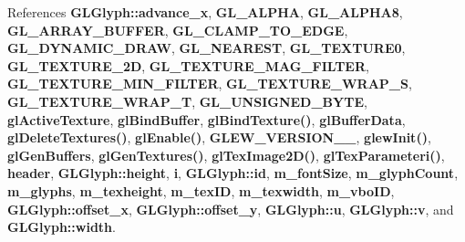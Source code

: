 References {\bf G\+L\+Glyph\+::advance\+\_\+x}, {\bf G\+L\+\_\+\+A\+L\+P\+HA}, {\bf G\+L\+\_\+\+A\+L\+P\+H\+A8}, {\bf G\+L\+\_\+\+A\+R\+R\+A\+Y\+\_\+\+B\+U\+F\+F\+ER}, {\bf G\+L\+\_\+\+C\+L\+A\+M\+P\+\_\+\+T\+O\+\_\+\+E\+D\+GE}, {\bf G\+L\+\_\+\+D\+Y\+N\+A\+M\+I\+C\+\_\+\+D\+R\+AW}, {\bf G\+L\+\_\+\+N\+E\+A\+R\+E\+ST}, {\bf G\+L\+\_\+\+T\+E\+X\+T\+U\+R\+E0}, {\bf G\+L\+\_\+\+T\+E\+X\+T\+U\+R\+E\+\_\+2D}, {\bf G\+L\+\_\+\+T\+E\+X\+T\+U\+R\+E\+\_\+\+M\+A\+G\+\_\+\+F\+I\+L\+T\+ER}, {\bf G\+L\+\_\+\+T\+E\+X\+T\+U\+R\+E\+\_\+\+M\+I\+N\+\_\+\+F\+I\+L\+T\+ER}, {\bf G\+L\+\_\+\+T\+E\+X\+T\+U\+R\+E\+\_\+\+W\+R\+A\+P\+\_\+S}, {\bf G\+L\+\_\+\+T\+E\+X\+T\+U\+R\+E\+\_\+\+W\+R\+A\+P\+\_\+T}, {\bf G\+L\+\_\+\+U\+N\+S\+I\+G\+N\+E\+D\+\_\+\+B\+Y\+TE}, {\bf gl\+Active\+Texture}, {\bf gl\+Bind\+Buffer}, {\bf gl\+Bind\+Texture()}, {\bf gl\+Buffer\+Data}, {\bf gl\+Delete\+Textures()}, {\bf gl\+Enable()}, {\bf G\+L\+E\+W\+\_\+\+V\+E\+R\+S\+I\+O\+N\+\_\+\_}, {\bf glew\+Init()}, {\bf gl\+Gen\+Buffers}, {\bf gl\+Gen\+Textures()}, {\bf gl\+Tex\+Image2\+D()}, {\bf gl\+Tex\+Parameteri()}, {\bf header}, {\bf G\+L\+Glyph\+::height}, {\bf i}, {\bf G\+L\+Glyph\+::id}, {\bf m\+\_\+font\+Size}, {\bf m\+\_\+glyph\+Count}, {\bf m\+\_\+glyphs}, {\bf m\+\_\+texheight}, {\bf m\+\_\+tex\+ID}, {\bf m\+\_\+texwidth}, {\bf m\+\_\+vbo\+ID}, {\bf G\+L\+Glyph\+::offset\+\_\+x}, {\bf G\+L\+Glyph\+::offset\+\_\+y}, {\bf G\+L\+Glyph\+::u}, {\bf G\+L\+Glyph\+::v}, and {\bf G\+L\+Glyph\+::width}.



